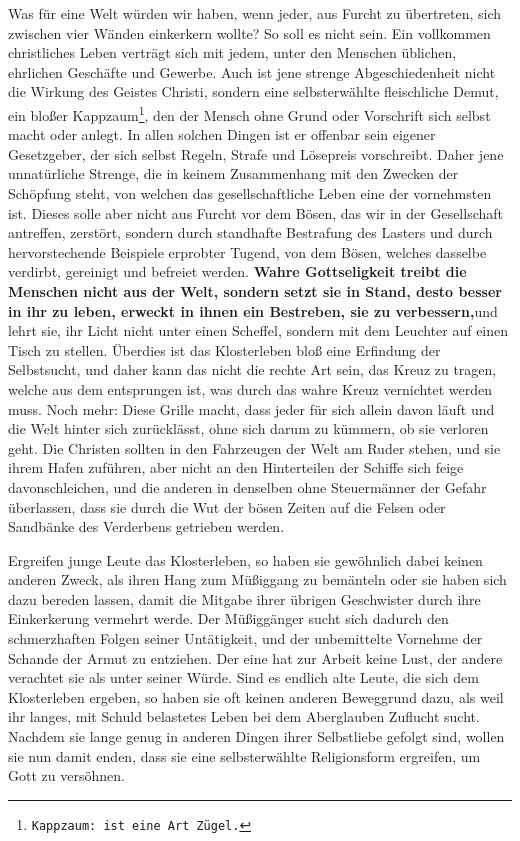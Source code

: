 \medskip

Was für eine Welt würden wir haben, wenn jeder, aus Furcht zu übertreten, sich
zwischen vier Wänden einkerkern wollte? So soll es nicht sein. Ein vollkommen
christliches Leben verträgt sich mit jedem, unter den Menschen üblichen,
ehrlichen Geschäfte und Gewerbe. Auch ist jene strenge Abgeschiedenheit nicht
die Wirkung des Geistes Christi, sondern eine selbsterwählte fleischliche
Demut, ein bloßer Kappzaum\footnote{\texttt{Kappzaum: ist eine Art Zügel.}}, den
der Mensch ohne Grund oder Vorschrift  sich
selbst macht oder anlegt. In allen solchen Dingen ist er offenbar sein eigener
Gesetzgeber, der sich selbst Regeln, Strafe und Lösepreis vorschreibt. Daher
jene unnatürliche Strenge, die in keinem
Zusammenhang mit den Zwecken der
Schöpfung steht, von welchen das gesellschaftliche Leben eine der vornehmsten
ist. Dieses solle aber nicht aus Furcht vor dem Bösen, das wir in der
Gesellschaft antreffen, zerstört, sondern durch standhafte Bestrafung des
Lasters und durch hervorstechende Beispiele erprobter Tugend, von dem Bösen,
welches dasselbe verdirbt, gereinigt und befreiet werden. \textbf{Wahre
Gottseligkeit
treibt die Menschen nicht aus der Welt, sondern setzt sie in Stand, desto besser
in ihr zu leben, erweckt in ihnen ein Bestreben, sie zu verbessern,}und lehrt
sie, ihr Licht nicht unter einen Scheffel, sondern mit dem Leuchter auf einen
Tisch zu stellen. Überdies ist das Klosterleben bloß eine Erfindung der
Selbstsucht, und daher kann das nicht die rechte Art sein, das Kreuz zu tragen,
welche aus dem entsprungen ist, was durch das wahre Kreuz vernichtet werden
muss.
Noch mehr: Diese Grille macht, dass jeder für sich allein davon läuft
und die
Welt hinter sich zurücklässt, ohne sich darum zu kümmern, ob sie verloren
geht. Die Christen sollten in den Fahrzeugen der
Welt am Ruder stehen, und sie
ihrem Hafen zuführen, aber nicht an den Hinterteilen der Schiffe sich feige
davonschleichen, und die anderen in denselben ohne Steuermänner der Gefahr
überlassen, dass sie durch die Wut der bösen Zeiten auf die Felsen oder
Sandbänke des Verderbens getrieben werden.
\label{ref:05_11_kloster_ende}

\medskip

Ergreifen junge Leute das Klosterleben, so haben
sie gewöhnlich dabei keinen
anderen Zweck, als ihren Hang zum Müßiggang zu bemänteln oder sie haben sich
dazu bereden lassen, damit die Mitgabe ihrer übrigen Geschwister durch ihre
Einkerkerung vermehrt werde. Der Müßiggänger sucht sich dadurch den
schmerzhaften Folgen seiner Untätigkeit, und der unbemittelte Vornehme der
Schande der Armut zu entziehen. Der eine hat zur Arbeit keine Lust, der andere
verachtet sie als unter seiner Würde. Sind es endlich alte Leute, die sich dem
Klosterleben ergeben, so haben sie oft keinen anderen Beweggrund dazu, als weil
ihr langes, mit Schuld belastetes Leben bei dem Aberglauben
Zuflucht sucht.
Nachdem sie lange genug in anderen Dingen ihrer Selbstliebe gefolgt sind, wollen
sie nun damit enden, dass sie eine selbsterwählte Religionsform ergreifen, um
Gott zu versöhnen.

